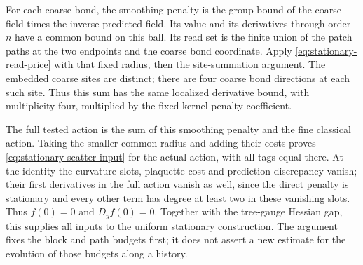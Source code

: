 For each coarse bond, the smoothing penalty is the group bound of
the coarse field times the inverse predicted field. Its value and
its derivatives through order $n$ have a common bound on this ball.
Its read set is the finite union of the patch paths at the two
endpoints and the coarse bond coordinate. Apply
\eqref{eq:stationary-read-price} with that fixed radius, then the
site-summation argument. The embedded coarse sites are distinct;
there are four coarse bond directions at each such site. Thus this
sum has the same localized derivative bound, with multiplicity
four, multiplied by the fixed kernel penalty coefficient.

The full tested action is the sum of this smoothing penalty and
the fine classical action. Taking the smaller common radius and
adding their costs proves
\eqref{eq:stationary-scatter-input} for the actual action, with all
tags equal there. At the identity the curvature slots, plaquette
cost and prediction discrepancy vanish; their first derivatives
in the full action vanish as well, since the direct penalty is
stationary and every other term has degree at least two in these
vanishing slots. Thus $f(0)=0$ and $D_yf(0)=0$.
Together with the tree-gauge Hessian gap, this supplies all inputs
to the uniform stationary construction. The argument fixes the
block and path budgets first; it does not assert a new estimate
for the evolution of those budgets along a history.
